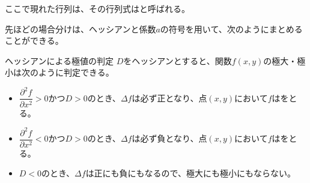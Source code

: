 \documentclass[../../../topic_calculus]{subfiles}
\begin{document}
ここで現れた行列は、その行列式はと呼ばれる。

\br

先ほどの場合分けは、ヘッシアンと係数$a$の符号を用いて、次のようにまとめることができる。

\begin{theorem}{ヘッシアンによる極値の判定}
  $D$をヘッシアンとすると、関数$f(x,y)$の極大・極小は次のように判定できる。
  \begin{itemize}
    \item $\dfrac{\partial^2 f}{\partial x^2} > 0$かつ$D > 0$のとき、$\Delta f$は必ず正となり、点$(x,y)$において$f$はをとる。
    \item $\dfrac{\partial^2 f}{\partial x^2} < 0$かつ$D > 0$のとき、$\Delta f$は必ず負となり、点$(x,y)$において$f$はをとる。
    \item $D < 0$のとき、$\Delta f$は正にも負にもなるので、極大にも極小にもならない。
  \end{itemize}
\end{theorem}
\end{document}
